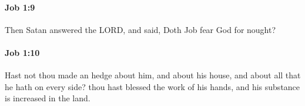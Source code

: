 		\paragraph{Job 1:9} %
			\label{JOB-1-9}

			Then Satan answered the LORD, and said, Doth Job fear God for nought?


		\paragraph{Job 1:10} %
			\label{JOB-1-10}

			Hast not thou made an hedge about him, and about his house, and about all that he hath on every side? thou hast blessed the work of his hands, and his substance is increased in the land.


